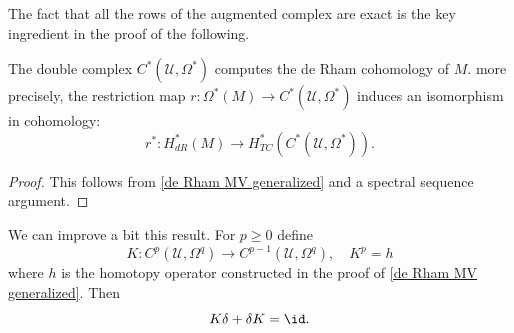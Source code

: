 The fact that all the rows of the augmented complex are exact is the key ingredient in the proof of the following.
\begin{theorem}
The double complex $C^*(\mathcal{U},\Omega^*)$ computes the de Rham cohomology of $M$. more precisely, the restriction map $r:\Omega^*(M)\to C^*(\mathcal{U},\Omega^*)$ 
induces an isomorphism in cohomology:
\[r^*:H^*_{dR}(M)\to H^*_{TC}(C^*(\mathcal{U},\Omega^*)).\]
\end{theorem}
\begin{proof}
This follows from \cref{de Rham MV generalized} and a spectral sequence argument.
\end{proof}
We can improve a bit this result. For $p\geq 0$ define
\[K:C^p(\mathcal{U},\Omega^q)\to C^{p-1}(\mathcal{U},\Omega^q),\quad K^p=h\]
where $h$ is the homotopy operator constructed in the proof of \cref{de Rham MV generalized}. Then
\[K\delta+\delta K=\id.\]

